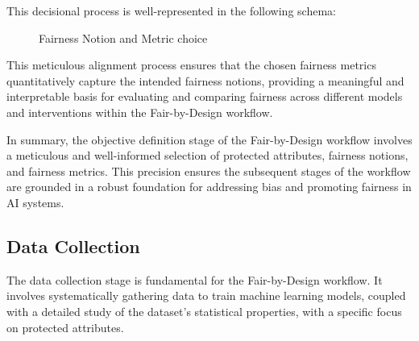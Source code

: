 This decisional process is well-represented in the following schema:
\begin{figure}[H]
    \centering
    \caption{Fairness Notion and Metric choice}
\end{figure}

This meticulous alignment process ensures that the chosen fairness metrics quantitatively capture the intended fairness notions, providing a meaningful and interpretable basis for evaluating and comparing fairness across different models and interventions within the Fair-by-Design workflow.

In summary, the objective definition stage of the Fair-by-Design workflow involves a meticulous and well-informed selection of protected attributes, fairness notions, and fairness metrics. This precision ensures the subsequent stages of the workflow are grounded in a robust foundation for addressing bias and promoting fairness in AI systems.

\subsection{Data Collection}
\label{subsection:data_collection}

The data collection stage is fundamental for the Fair-by-Design workflow. It involves systematically gathering data to train machine learning models, coupled with a detailed study of the dataset's statistical properties, with a specific focus on protected attributes.

